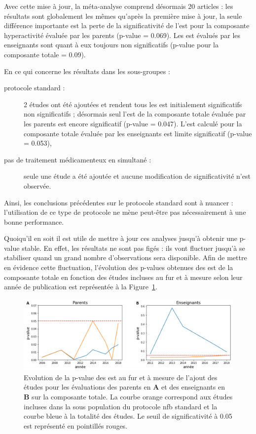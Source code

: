 Avec cette mise à jour, la méta-analyse comprend désormais 20 articles : les résultats sont globalement les mêmes qu'après la première mise à jour, la seule
différence importante est la perte de la significativité de l'\gls{est} pour la composante hyperactivité évaluée par les parents (p-value = 0.069).
Les \gls{est} évalués par les enseignants sont quant à eux toujours non significatifs (p-value pour la composante totale =  0.09).

En ce qui concerne les résultats dans les sous-groupes :
\begin{description}
\item[protocole standard :] 2 études ont été ajoutées \citep{Aggensteiner2019, Minder2018} et rendent tous les \gls{est} initialement significatifs 
non significatifs ; désormais seul l'\gls{est} de la composante totale évaluée par les parents est encore significatif (p-value = 0.047). 
L'\gls{est} calculé pour la composante totale évaluée par les enseignants est limite significatif (p-value = 0.053),
\item [pas de traitement médicamenteux en simultané :] seule une étude a été ajoutée \citep{Moreno2019} et aucune modification de significativité
n'est observée.
\end{description}

Ainsi, les conclusions précédentes sur le protocole standard sont à nuancer : l'utilisation de ce type de protocole ne mène peut-être pas nécessairement
à une bonne performance. 

Quoiqu'il en soit il est utile de mettre à jour ces analyses jusqu'à obtenir une p-value stable. En effet, les résultats ne sont 
pas figés : ils vont fluctuer jusqu'à se stabiliser quand un grand nombre d'observations sera disponible. Afin de mettre en évidence cette fluctuation, 
l'évolution des p-values obtenues des \gls{est} de la composante totale en fonction des études incluses au fur et à mesure selon leur année de publication 
est représentée à la Figure~\ref{Figure:meta_analysis_evolution_pvalue}. 

\begin{figure}[h!]
  \centering
	\includegraphics[width=1\linewidth]{figures/chapter-2/meta-analysis-evolution-p-value} 
  \caption{Evolution de la p-value des \gls{est} au fur et à mesure de l'ajout des études pour les évaluations des 
	parents en \textbf{A} et des enseignants en \textbf{B} sur la composante totale.
	La courbe orange correspond aux études incluses dans la sous population du protocole \gls{nfb} standard et la courbe bleue à la totalité des études.
	Le seuil de significativité à 0.05 est représenté en pointillés rouges.}
  \label{Figure:meta_analysis_evolution_pvalue}
\end{figure}

